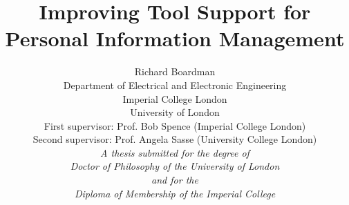 \documentclass[10pt,a4paper]{report} %
\begin{document}
\pagestyle{plain}

\setcounter{page}{0}






\addtolength{\oddsidemargin}{4mm}





\title{\textbf\Huge {Improving Tool Support for \\ Personal Information Management}}




\author{\Large Richard Boardman\\Department of Electrical and Electronic Engineering\\Imperial College London\\University of London\\[2cm] First supervisor: Prof. Bob Spence (Imperial College London)\\Second supervisor: Prof. Angela Sasse (University College London)\\[2cm] \textsl{A thesis submitted for the degree of}\\ \textsl{Doctor of Philosophy of the University of London}\\ \textsl{and for the}\\ \textsl{Diploma of Membership of the Imperial College}}


\end{document}
